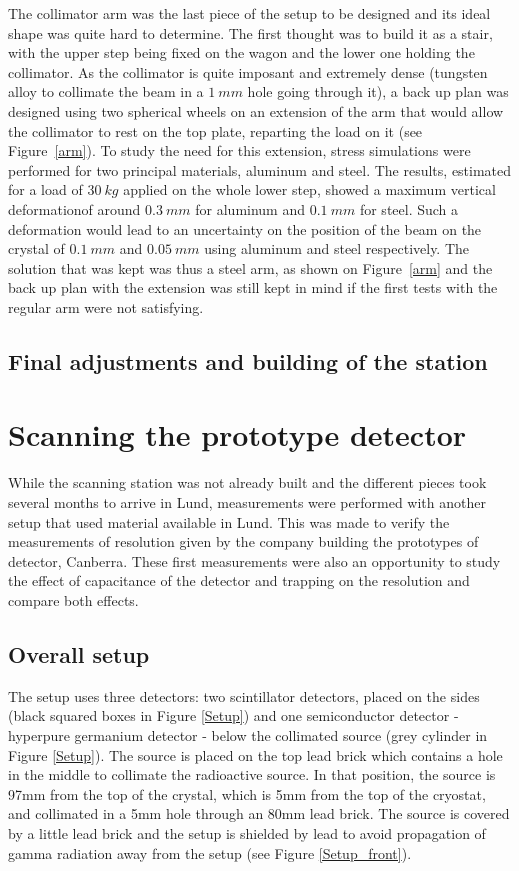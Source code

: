\documentclass[11pt,a4paper]{article}
\begin{document}
The collimator arm was the last piece of the setup to be designed and its ideal shape was quite hard to determine. The first thought was to build it as a stair, with the upper step being fixed on the wagon and the lower one holding the collimator. As the collimator is quite imposant and extremely dense (tungsten alloy to collimate the beam in a $1~mm$ hole going through it), a back up plan was designed using two spherical wheels on an extension of the arm that would allow the collimator to rest on the top plate, reparting the load on it (see Figure~\ref{arm}). To study the need for this extension, stress simulations were performed for two principal materials, aluminum and steel. The results, estimated for a load of $30~kg$ applied on the whole lower step, showed a maximum vertical deformationof around $0.3~mm$ for aluminum and $0.1~mm$ for steel. Such a deformation would lead to an uncertainty on the position of the beam on the crystal of $0.1~mm$ and $0.05~mm$ using aluminum and steel respectively. The solution that was kept was thus a steel arm, as shown on Figure~\ref{arm} and the back up plan with the extension was still kept in mind if the first tests with the regular arm were not satisfying.

\subsection{Final adjustments and building of the station}



\section{Scanning the prototype detector}

While the scanning station was not already built and the different pieces took several months to arrive in Lund, measurements were performed with another setup that used material available in Lund. This was made to verify the measurements of resolution given by the company building the prototypes of detector, Canberra. These first measurements were also an opportunity to study the effect of capacitance of the detector and trapping on the resolution and compare both effects.

\subsection{Overall setup} \label{setup}

The setup uses three detectors: two scintillator detectors, placed on the sides (black squared boxes in Figure \ref{Setup}) and one semiconductor detector - hyperpure germanium detector - below the collimated source (grey cylinder in Figure \ref{Setup}). The source is placed on the top lead brick which contains a hole in the middle to collimate the radioactive source. In that position, the source is 97mm from the top of the crystal, which is 5mm from the top of the cryostat, and collimated in a 5mm hole through an 80mm lead brick. The source is covered by a little lead brick and the setup is shielded by lead to avoid propagation of gamma radiation away from the setup (see Figure \ref{Setup_front}).
\end{document}
